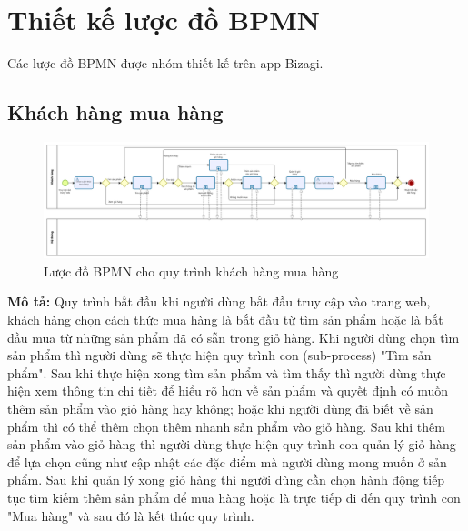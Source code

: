 \section{Thiết kế lược đồ BPMN}

Các lược đồ BPMN được nhóm thiết kế trên app Bizagi.
\subsection{Khách hàng mua hàng}
\begin{figure}[!htp]
	\centering
	\includegraphics[width=17cm]{img/BPMN/customer_buy/customer_buy.png}
	\newline
	\caption{Lược đồ BPMN cho quy trình khách hàng mua hàng}
\end{figure}
\textbf{Mô tả:} Quy trình bắt đầu khi người dùng bắt đầu truy cập vào trang web, khách hàng chọn cách thức mua hàng là bắt đầu từ tìm sản phẩm hoặc là bắt đầu mua từ những sản phẩm đã có sẵn trong giỏ hàng. Khi người dùng chọn tìm sản phẩm thì người dùng sẽ thực hiện quy trình con (sub-process) "Tìm sản phẩm". Sau khi thực hiện xong tìm sản phẩm và tìm thấy thì người dùng thực hiện xem thông tin chi tiết để hiểu rõ hơn về sản phẩm và quyết định có muốn thêm sản phẩm vào giỏ hàng hay không; hoặc khi người dùng đã biết về sản phẩm thì có thể thêm chọn thêm nhanh sản phẩm vào giỏ hàng. Sau khi thêm sản phẩm vào giỏ hàng thì người dùng thực hiện quy trình con quản lý giỏ hàng để lựa chọn cũng như cập nhật các đặc điểm mà người dùng mong muốn ở sản phẩm. Sau khi quản lý xong giỏ hàng thì người dùng cần chọn hành động tiếp tục tìm kiếm thêm sản phẩm để mua hàng hoặc là trực tiếp đi đến quy trình con "Mua hàng" và sau đó là kết thúc quy trình.



